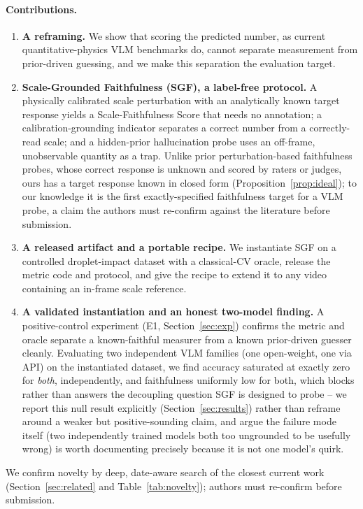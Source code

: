 \documentclass[11pt]{article}
\begin{document}
\paragraph{Contributions.}
\begin{enumerate}
\item \textbf{A reframing.} We show that scoring the predicted number, as current
quantitative-physics VLM benchmarks do, cannot separate measurement from
prior-driven guessing, and we make this separation the evaluation target.
\item \textbf{Scale-Grounded Faithfulness (SGF), a label-free protocol.} A
physically calibrated scale perturbation with an analytically known target
response yields a Scale-Faithfulness Score that needs no annotation; a
calibration-grounding indicator separates a correct number from a correctly-read
scale; and a hidden-prior hallucination probe uses an off-frame, unobservable
quantity as a trap. Unlike prior perturbation-based faithfulness probes, whose
correct response is unknown and scored by raters or judges, ours has a target
response known in closed form (Proposition~\ref{prop:ideal}); to our knowledge it
is the first exactly-specified faithfulness target for a VLM probe, a claim the
authors must re-confirm against the literature before submission.
\item \textbf{A released artifact and a portable recipe.} We instantiate SGF on a
controlled droplet-impact dataset with a classical-CV oracle, release the metric
code and protocol, and give the recipe to extend it to any video containing an
in-frame scale reference.
\item \textbf{A validated instantiation and an honest two-model finding.} A
positive-control experiment (E1, Section~\ref{sec:exp}) confirms the metric and
oracle separate a known-faithful measurer from a known prior-driven guesser
cleanly. Evaluating two independent VLM families (one open-weight, one via API)
on the instantiated dataset, we find accuracy saturated at exactly zero for
\emph{both}, independently, and faithfulness uniformly low for both, which
blocks rather than answers the decoupling question SGF is designed to probe --
we report this null result explicitly (Section~\ref{sec:results}) rather than
reframe around a weaker but positive-sounding claim, and argue the failure mode
itself (two independently trained models both too ungrounded to be usefully
wrong) is worth documenting precisely because it is not one model's quirk.
\end{enumerate}
We confirm novelty by deep, date-aware search of the closest current work
(Section~\ref{sec:related} and Table~\ref{tab:novelty}); authors must re-confirm
before submission.
\end{document}
